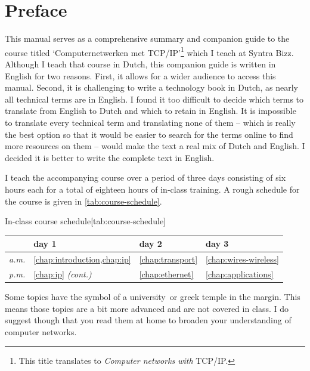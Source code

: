 \chapter{Preface}

This manual serves as a comprehensive summary and companion guide to the course titled `Computernetwerken met \acs{TCP}/\acs{IP}'\footnote{This title translates to \emph{Computer networks with} \acs{TCP}/\acs{IP}.} which I teach at Syntra Bizz.
Although I teach that course in Dutch, this companion guide is written in English for two reasons.
First, it allows for a wider audience to access this manual.
Second, it is challenging to write a technology book in Dutch, as nearly all technical terms are in English.
I found it too difficult to decide which terms to translate from English to Dutch and which to retain in English.
It is impossible to translate every technical term and translating none of them -- which is really the best option so that it would be easier to search for the terms online to find more resources on them -- would make the text a real mix of Dutch and English.
I decided it is better to write the complete text in English.

I teach the accompanying course over a period of three days consisting of six hours each for a total of eighteen hours of in-class training.
A rough schedule for the course is given in \vref{tab:course-schedule}.

\begin{table}
\begin{sidecaption}{In-class course schedule}[tab:course-schedule]
\centering
\begin{tabular}{rlll}
               & {day 1}                    & {day 2}              & {day 3}             \\
\midrule
\textit{a.m.}  & \cref{chap:introduction,chap:ip}  & \cref{chap:transport} & \cref{chap:wires-wireless} \\
\textit{p.m.}  & \cref{chap:ip} \emph{(cont.)}     & \cref{chap:ethernet}        & \cref{chap:applications}   \\
\end{tabular}
\end{sidecaption}
\end{table}

Some topics have the symbol of a university\marginsymbol\ or greek temple in the margin.
This means those topics are a bit more advanced and are not covered in class.
I do suggest though that you read them at home to broaden your understanding of computer networks.

